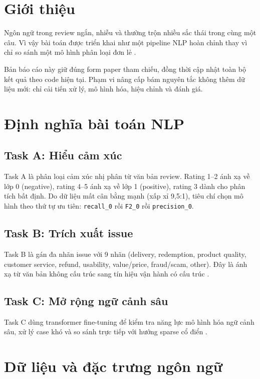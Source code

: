 ﻿\documentclass[12pt,a4paper]{article}
\begin{document}
\tableofcontents
\newpage
{}

\section{Giới thiệu}
Ngôn ngữ trong review ngắn, nhiễu và thường trộn nhiều sắc thái trong cùng một câu. Vì vậy bài toán được triển khai như một pipeline NLP hoàn chỉnh thay vì chỉ so sánh một mô hình phân loại đơn lẻ \cite{jurafsky2026,turney2002}.

Bản báo cáo này giữ đúng form paper tham chiếu, đồng thời cập nhật toàn bộ kết quả theo code hiện tại. Phạm vi nâng cấp bám nguyên tắc không thêm dữ liệu mới: chỉ cải tiến xử lý, mô hình hóa, hiệu chỉnh và đánh giá.

\section{Định nghĩa bài toán NLP}
\subsection{Task A: Hiểu cảm xúc}
Task A là phân loại cảm xúc nhị phân từ văn bản review. Rating 1--2 ánh xạ về lớp 0 (negative), rating 4--5 ánh xạ về lớp 1 (positive), rating 3 dành cho phân tích bất định. Do dữ liệu mất cân bằng mạnh (xấp xỉ 9,5:1), tiêu chí chọn mô hình theo thứ tự ưu tiên: \texttt{recall\_0} rồi \texttt{F2\_0} rồi \texttt{precision\_0}.

\subsection{Task B: Trích xuất issue}
Task B là gán đa nhãn issue với 9 nhãn (delivery, redemption, product quality, customer service, refund, usability, value/price, fraud/scam, other). Đây là ánh xạ từ văn bản không cấu trúc sang tín hiệu vận hành có cấu trúc \cite{tsoumakas2011,zhang2014}.

\subsection{Task C: Mở rộng ngữ cảnh sâu}
Task C dùng transformer fine-tuning để kiểm tra năng lực mô hình hóa ngữ cảnh sâu, xử lý case khó và so sánh trực tiếp với hướng sparse cổ điển \cite{vaswani2017,devlin2019}.

\section{Dữ liệu và đặc trưng ngôn ngữ}
\end{document}
